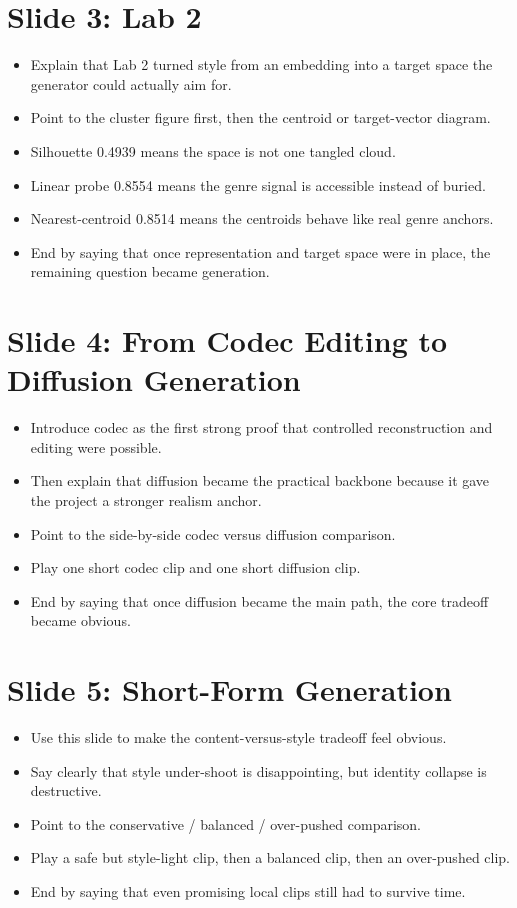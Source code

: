 \documentclass[11pt]{article}
\begin{document}
\section*{Slide 3: Lab 2}
\begin{itemize}
\item Explain that Lab 2 turned style from an embedding into a target space the generator could actually aim for.
\item Point to the cluster figure first, then the centroid or target-vector diagram.
\item Silhouette 0.4939 means the space is not one tangled cloud.
\item Linear probe 0.8554 means the genre signal is accessible instead of buried.
\item Nearest-centroid 0.8514 means the centroids behave like real genre anchors.
\item End by saying that once representation and target space were in place, the remaining question became generation.
\end{itemize}

\section*{Slide 4: From Codec Editing to Diffusion Generation}
\begin{itemize}
\item Introduce codec as the first strong proof that controlled reconstruction and editing were possible.
\item Then explain that diffusion became the practical backbone because it gave the project a stronger realism anchor.
\item Point to the side-by-side codec versus diffusion comparison.
\item Play one short codec clip and one short diffusion clip.
\item End by saying that once diffusion became the main path, the core tradeoff became obvious.
\end{itemize}

\section*{Slide 5: Short-Form Generation}
\begin{itemize}
\item Use this slide to make the content-versus-style tradeoff feel obvious.
\item Say clearly that style under-shoot is disappointing, but identity collapse is destructive.
\item Point to the conservative / balanced / over-pushed comparison.
\item Play a safe but style-light clip, then a balanced clip, then an over-pushed clip.
\item End by saying that even promising local clips still had to survive time.
\end{itemize}
\end{document}
